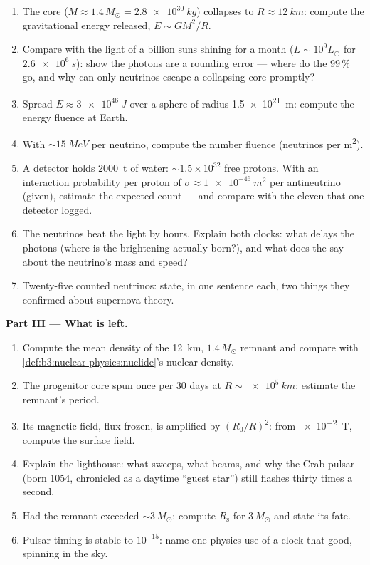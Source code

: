 \begin{problem}
\begin{enumerate}[resume]
  \item The core ($M \approx 1.4\,M_\odot = \qty{2.8e30}{kg}$)
        collapses to $R \approx \qty{12}{km}$: compute the
        gravitational energy released, $E \sim GM^2/R$.
  \item Compare with the light of a billion suns shining for a
        month ($L \sim 10^{9}L_\odot$ for $\qty{2.6e6}{s}$):
        show the photons are a rounding error --- where do the
        99\,\% go, and why can only neutrinos escape a
        collapsing core promptly?
  \item Spread $E \approx \qty{3e46}{J}$ over a sphere of
        radius \qty{1.5e21}{m}: compute the energy fluence at
        Earth.
  \item With $\sim\qty{15}{MeV}$ per neutrino, compute the
        number fluence (neutrinos per \unit{m^2}).
  \item A detector holds \qty{2000}{t} of water:
        ${\sim}1.5\times10^{32}$ free protons. With an
        interaction probability per proton of
        $\sigma \approx \qty{1e-46}{m^2}$ per antineutrino
        (given), estimate the expected count --- and compare
        with the eleven that one detector logged.
  \item The neutrinos beat the light by hours. Explain both
        clocks: what delays the photons (where is the
        brightening actually born?), and what does the
         say about the neutrino's mass and
        speed?
  \item Twenty-five counted neutrinos: state, in one sentence
        each, two things they confirmed about supernova theory.
\end{enumerate}

\medskip\noindent\textbf{Part III --- What is left.}

\begin{enumerate}[resume]
  \item Compute the mean density of the \qty{12}{km},
        $1.4\,M_\odot$ remnant and compare with
        \cref{def:b3:nuclear-physics:nuclide}'s nuclear
        density.
  \item The progenitor core spun once per 30 days at
        $R \sim \qty{e5}{km}$: estimate the remnant's period.
  \item Its magnetic field, flux-frozen, is amplified by
        $(R_0/R)^2$: from \qty{e-2}{T}, compute the surface
        field.
  \item Explain the lighthouse: what sweeps, what beams, and
        why the Crab pulsar (born 1054, chronicled as a daytime
        ``guest star'') still flashes thirty times a second.
  \item Had the remnant exceeded ${\sim}3\,M_\odot$: compute
        $R_{\text{s}}$ for $3\,M_\odot$ and state its fate.
  \item Pulsar timing is stable to $10^{-15}$: name one physics
        use of a clock that good, spinning in the sky.
\end{enumerate}


\end{problem}
